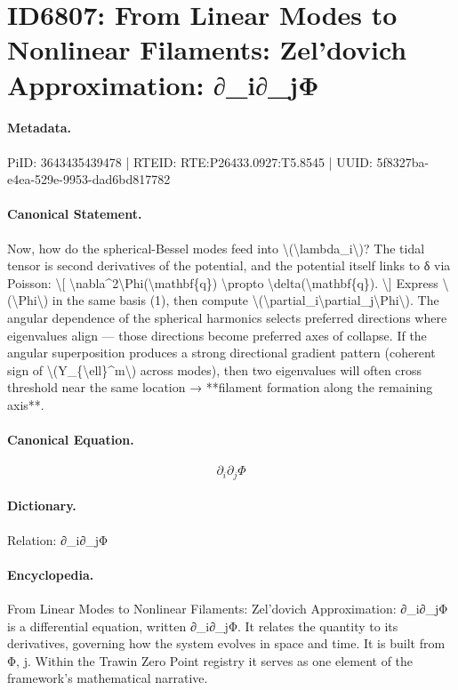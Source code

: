 \section*{ID6807: From Linear Modes to Nonlinear Filaments: Zel’dovich Approximation: ∂\_i∂\_jΦ}
\paragraph{Metadata.}
PiID: 3643435439478 | RTEID: RTE:P26433.0927:T5.8545 | UUID: 5f8327ba-e4ea-529e-9953-dad6bd817782

\paragraph{Canonical Statement.}
Now, how do the spherical-Bessel modes feed into \textbackslash{}(\textbackslash{}lambda\_i\textbackslash{})? The tidal tensor is second derivatives of the potential, and the potential itself links to δ via Poisson: \textbackslash{}[ \textbackslash{}nabla\textasciicircum{}2\textbackslash{}Phi(\textbackslash{}mathbf\{q\}) \textbackslash{}propto \textbackslash{}delta(\textbackslash{}mathbf\{q\}). \textbackslash{}] Express \textbackslash{}(\textbackslash{}Phi\textbackslash{}) in the same basis (1), then compute \textbackslash{}(\textbackslash{}partial\_i\textbackslash{}partial\_j\textbackslash{}Phi\textbackslash{}). The angular dependence of the spherical harmonics selects preferred directions where eigenvalues align — those directions become preferred axes of collapse. If the angular superposition produces a strong directional gradient pattern (coherent sign of \textbackslash{}(Y\_\{\textbackslash{}ell\}\textasciicircum{}m\textbackslash{}) across modes), then two eigenvalues will often cross threshold near the same location → **filament formation along the remaining axis**.

\paragraph{Canonical Equation.}
\[
\partial_i\partial_j\Phi
\]

\paragraph{Dictionary.}
Relation: ∂\_i∂\_jΦ

\paragraph{Encyclopedia.}
From Linear Modes to Nonlinear Filaments: Zel’dovich Approximation: ∂\_i∂\_jΦ is a differential equation, written ∂\_i∂\_jΦ. It relates the quantity to its derivatives, governing how the system evolves in space and time. It is built from Φ, j. Within the Trawin Zero Point registry it serves as one element of the framework's mathematical narrative.
